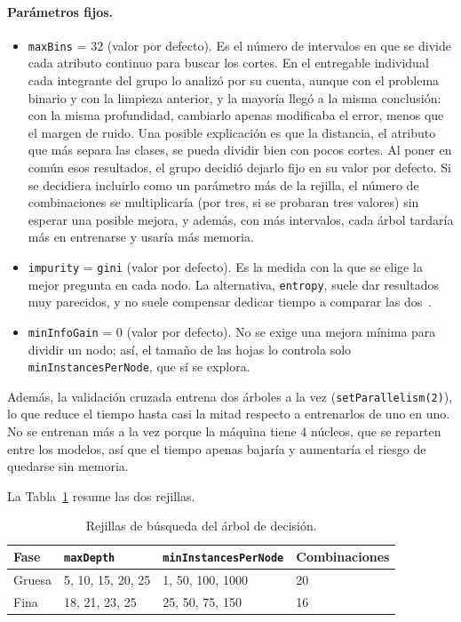 \documentclass[12pt,a4paper]{article}
\begin{document}
\paragraph{Parámetros fijos.}
\begin{itemize}
    \item \texttt{maxBins} = 32 (valor por defecto). Es el número de
    intervalos en que se divide cada atributo continuo para buscar los
    cortes. En el entregable individual cada integrante del grupo lo
    analizó por su cuenta, aunque con el problema binario y con la limpieza
    anterior, y la mayoría llegó a la misma conclusión: con la misma
    profundidad, cambiarlo apenas modificaba el error, menos que el margen
    de ruido. Una posible explicación es que la distancia, el atributo que
    más separa las clases, se pueda dividir bien con pocos cortes. Al poner
    en común esos resultados, el grupo decidió dejarlo fijo en su valor por
    defecto. Si se decidiera incluirlo como un parámetro más de la rejilla,
    el número de combinaciones se multiplicaría (por tres, si se probaran
    tres valores) sin esperar una posible mejora, y además, con más
    intervalos, cada árbol tardaría más en entrenarse y usaría más memoria.
    \item \texttt{impurity} = \texttt{gini} (valor por defecto). Es la medida
    con la que se elige la mejor pregunta en cada nodo. La alternativa,
    \texttt{entropy}, suele dar resultados muy parecidos, y no suele
    compensar dedicar tiempo a comparar las dos~\cite[cap.~3]{raschka2022}.
    \item \texttt{minInfoGain} = 0 (valor por defecto). No se exige una
    mejora mínima para dividir un nodo; así, el tamaño de las hojas lo
    controla solo \texttt{minInstancesPerNode}, que sí se explora.
\end{itemize}

Además, la validación cruzada entrena dos árboles a la vez
(\texttt{setParallelism(2)}), lo que reduce el tiempo hasta casi la mitad respecto a entrenarlos de uno en uno. No se entrenan más a la vez porque la
máquina tiene 4 núcleos, que se reparten entre los modelos, así que el
tiempo apenas bajaría y aumentaría el riesgo de quedarse sin memoria.

La Tabla~\ref{tab:rejilla-dt} resume las dos rejillas.
 
\begin{table}[H]
\centering
\small
\begin{tabular}{llll}
\toprule
\textbf{Fase} & \texttt{maxDepth} & \texttt{minInstancesPerNode} & \textbf{Combinaciones} \\
\midrule
Gruesa & 5, 10, 15, 20, 25 & 1, 50, 100, 1000 & 20 \\
Fina   & 18, 21, 23, 25    & 25, 50, 75, 150  & 16 \\
\bottomrule
\end{tabular}
\caption{Rejillas de búsqueda del árbol de decisión.}
\label{tab:rejilla-dt}
\end{table}
 
\end{document}
